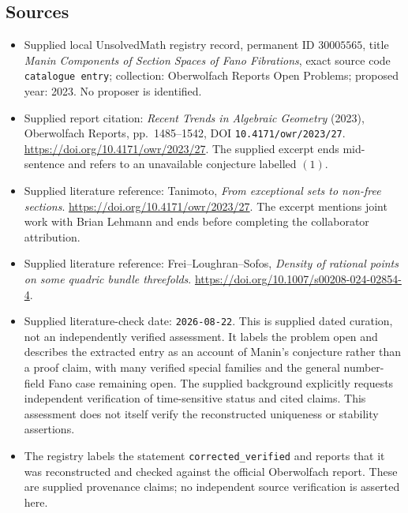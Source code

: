 \documentclass[11pt]{article}
\begin{document}
\subsection{Sources}
\begin{itemize}
\item Supplied local UnsolvedMath registry record, permanent ID \(30005565\), title \emph{Manin Components of Section Spaces of Fano Fibrations}, exact source code \texttt{catalogue entry}; collection: Oberwolfach Reports Open Problems; proposed year: 2023. No proposer is identified.
\item Supplied report citation: \emph{Recent Trends in Algebraic Geometry} (2023), Oberwolfach Reports, pp.~1485--1542, DOI \texttt{10.4171/owr/2023/27}. \url{https://doi.org/10.4171/owr/2023/27}. The supplied excerpt ends mid-sentence and refers to an unavailable conjecture labelled \((1)\).
\item Supplied literature reference: Tanimoto, \emph{From exceptional sets to non-free sections}. \url{https://doi.org/10.4171/owr/2023/27}. The excerpt mentions joint work with Brian Lehmann and ends before completing the collaborator attribution.
\item Supplied literature reference: Frei--Loughran--Sofos, \emph{Density of rational points on some quadric bundle threefolds}. \url{https://doi.org/10.1007/s00208-024-02854-4}.
\item Supplied literature-check date: \texttt{2026-08-22}. This is supplied dated curation, not an independently verified assessment. It labels the problem open and describes the extracted entry as an account of Manin's conjecture rather than a proof claim, with many verified special families and the general number-field Fano case remaining open. The supplied background explicitly requests independent verification of time-sensitive status and cited claims. This assessment does not itself verify the reconstructed uniqueness or stability assertions.
\item The registry labels the statement \texttt{corrected\_verified} and reports that it was reconstructed and checked against the official Oberwolfach report. These are supplied provenance claims; no independent source verification is asserted here.
\end{itemize}
\end{document}
